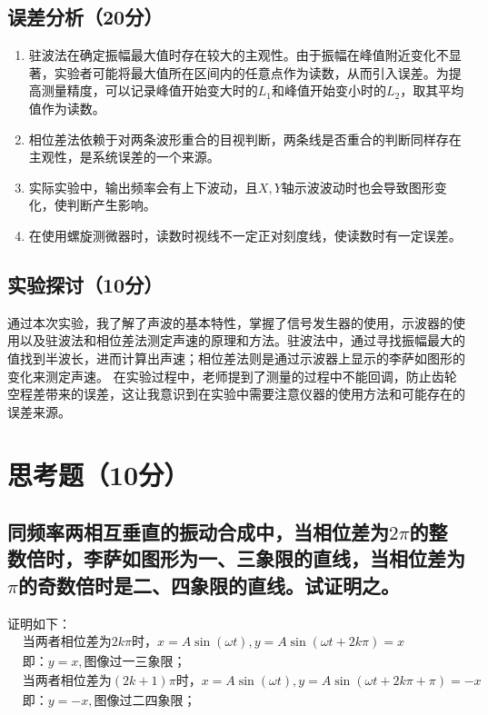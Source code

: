 \documentclass{../template/Report}
\begin{document}
\begin{fullreportonly}
	\subsection{误差分析（20分）}
	\begin{enumerate}
    \item 驻波法在确定振幅最大值时存在较大的主观性。由于振幅在峰值附近变化不显著，实验者可能将最大值所在区间内的任意点作为读数，从而引入误差。为提高测量精度，可以记录峰值开始变大时的$L_1$和峰值开始变小时的$L_2$，取其平均值作为读数。
    \item 相位差法依赖于对两条波形重合的目视判断，两条线是否重合的判断同样存在主观性，是系统误差的一个来源。
    \item 实际实验中，输出频率会有上下波动，且$X, Y$轴示波波动时也会导致图形变化，使判断产生影响。
    \item 在使用螺旋测微器时，读数时视线不一定正对刻度线，使读数时有一定误差。
	\end{enumerate}

	\subsection{实验探讨（10分）}
	通过本次实验，我了解了声波的基本特性，掌握了信号发生器的使用，示波器的使用以及驻波法和相位差法测定声速的原理和方法。驻波法中，通过寻找振幅最大的值找到半波长，进而计算出声速；相位差法则是通过示波器上显示的李萨如图形的变化来测定声速。
	在实验过程中，老师提到了测量的过程中不能回调，防止齿轮空程差带来的误差，这让我意识到在实验中需要注意仪器的使用方法和可能存在的误差来源。
	\section{思考题（10分）}
	\subsection{同频率两相互垂直的振动合成中，当相位差为$2\pi$的整数倍时，李萨如图形为一、三象限的直线，当相位差为$\pi$的奇数倍时是二、四象限的直线。试证明之。}
	证明如下：
	\begin{align*}
		&\text{当两者相位差为}2k\pi\text{时}，x = A\sin(\omega t), y = A\sin(\omega t + 2k\pi) = x \\
		&\text{即：}y = x, \text{图像过一三象限；}\\
		&\text{当两者相位差为}(2k + 1)\pi\text{时}，x = A\sin(\omega t), y = A\sin(\omega t + 2k\pi + \pi) = -x \\
		&\text{即：}y = -x, \text{图像过二四象限；}\\
	\end{align*}

\end{fullreportonly}
\end{document}

